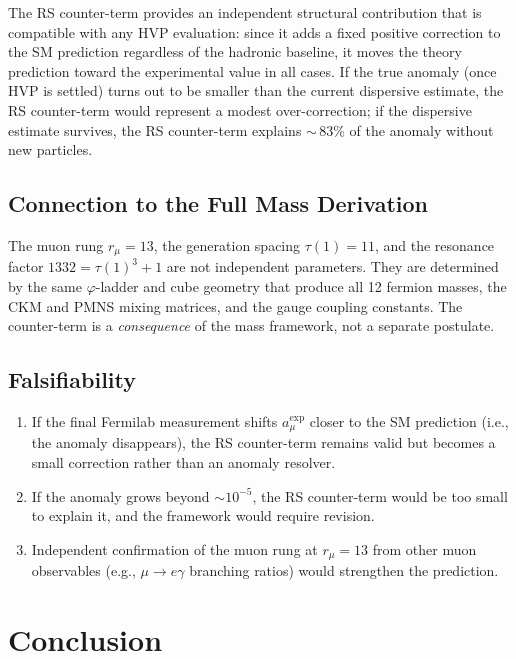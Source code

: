 \documentclass[12pt,a4paper]{article}
\theoremstyle{definition}
\theoremstyle{remark}
\begin{document}
The RS counter-term provides an independent structural contribution that
is compatible with any HVP evaluation: since it adds a fixed positive
correction to the SM prediction regardless of the hadronic baseline, it
moves the theory prediction toward the experimental value in all cases.
If the true anomaly (once HVP is settled) turns out to be smaller than
the current dispersive estimate, the RS counter-term would represent
a modest over-correction; if the dispersive estimate survives, the RS
counter-term explains ${\sim}\,83\%$ of the anomaly without new particles.

\subsection{Connection to the Full Mass Derivation}

The muon rung $r_\mu = 13$, the generation spacing $\tau(1) = 11$, and
the resonance factor $1332 = \tau(1)^3 + 1$ are not independent
parameters.  They are determined by the same $\varphi$-ladder and cube
geometry that produce all 12 fermion masses, the CKM and PMNS mixing
matrices, and the gauge coupling constants.  The counter-term is a
\emph{consequence} of the mass framework, not a separate postulate.

\subsection{Falsifiability}

\begin{enumerate}
  \item If the final Fermilab measurement shifts $a_\mu^{\mathrm{exp}}$
  closer to the SM prediction (i.e., the anomaly disappears), the RS
  counter-term remains valid but becomes a small correction rather than
  an anomaly resolver.

  \item If the anomaly grows beyond $\sim\!10^{-5}$, the RS counter-term
  would be too small to explain it, and the framework would require
  revision.

  \item Independent confirmation of the muon rung at $r_\mu = 13$ from
  other muon observables (e.g., $\mu \to e\gamma$ branching ratios)
  would strengthen the prediction.
\end{enumerate}

\section{Conclusion}
\label{sec:conclusion}
\end{document}
